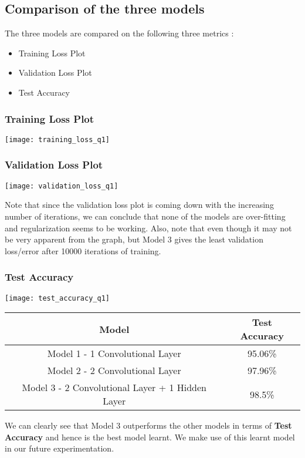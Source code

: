\documentclass[a4paper]{article}
\begin{document}
\subsection{Comparison of the three models}
The three models are compared on the following three metrics :
\begin{itemize}
\item Training Loss Plot
\item Validation Loss Plot
\item Test Accuracy 
\end{itemize}
\subsubsection{Training Loss Plot}
\begin{center}
\texttt{[image: training\_loss\_q1]}
\end{center}
\subsubsection{Validation Loss Plot}
\begin{center}
\texttt{[image: validation\_loss\_q1]}
\end{center}
Note that since the validation loss plot is coming down with the increasing number of iterations, we can conclude that none of the models are over-fitting and regularization seems to be working. Also, note that even though it may not be very apparent from the graph, but Model 3 gives the least validation loss/error after 10000 iterations of training.

\subsubsection{Test Accuracy}
\begin{center}
\texttt{[image: test\_accuracy\_q1]}
\end{center}

\begin{center}
\begin{tabular}{|c|c|}
\hline
Model & Test Accuracy \\
\hline
Model 1 - 1 Convolutional Layer & 95.06\%  \\
\hline
Model 2 - 2 Convolutional Layer & 97.96\%  \\
\hline
Model 3 - 2 Convolutional Layer + 1 Hidden Layer & 98.5\%  \\
\hline
\end{tabular}
\end{center}
We can clearly see that Model 3 outperforms the other models in terms of \textbf{Test Accuracy} and hence is the best model learnt. We make use of this learnt model in our future experimentation.
\end{document}
